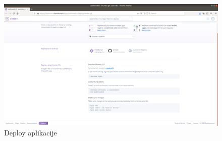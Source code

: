 			\begin{figure}[H]
				\includegraphics[scale=0.25]{slike/deployHeroku.png}
				\centering
				\caption{Deploy aplikacije}
				\label{fig:promjene}
			\end{figure}
			
			
			\eject 